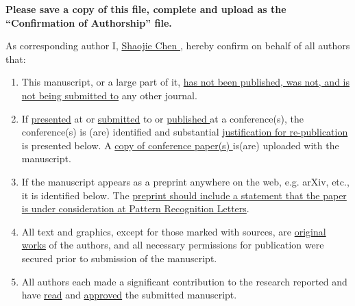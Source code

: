\documentclass[times,twocolumn,final,authoryear]{elsarticle}
\begin{document}
\thispagestyle{empty}

\begin{table}[!th]

\begin{minipage}{.9\textwidth}
\baselineskip12pt
\ifpreprint
  \vspace*{1pc}
\else
  \vspace*{-6pc}
\fi

\vskip6pt


\vskip1pc


{\bf Please save a copy of this file, complete and upload as the
``Confirmation of Authorship'' file.}

\vskip1pc

As corresponding author
I, \underline{  Shaojie Chen  }, hereby confirm on behalf of all authors that:

\vskip1pc

\begin{enumerate}
\itemsep=3pt
\item This manuscript, or a large part of it, \underline {has not been
published,  was not, and is not being submitted to} any other journal.

\item If \underline {presented} at or \underline {submitted} to or
\underline  {published }at a conference(s), the conference(s) is (are)
identified and  substantial \underline {justification for
re-publication} is presented  below. A \underline {copy of
conference paper(s) }is(are) uploaded with the  manuscript.

\item If the manuscript appears as a preprint anywhere on the web, e.g.
arXiv,  etc., it is identified below. The \underline {preprint should
include a  statement that the paper is under consideration at Pattern
Recognition  Letters}.

\item All text and graphics, except for those marked with sources, are
\underline  {original works} of the authors, and all necessary
permissions for  publication were secured prior to submission of the
manuscript.

\item All authors each made a significant contribution to the research
reported  and have \underline {read} and \underline {approved} the
submitted  manuscript.
\end{enumerate}


\end{minipage}
\end{table}
\end{document}
